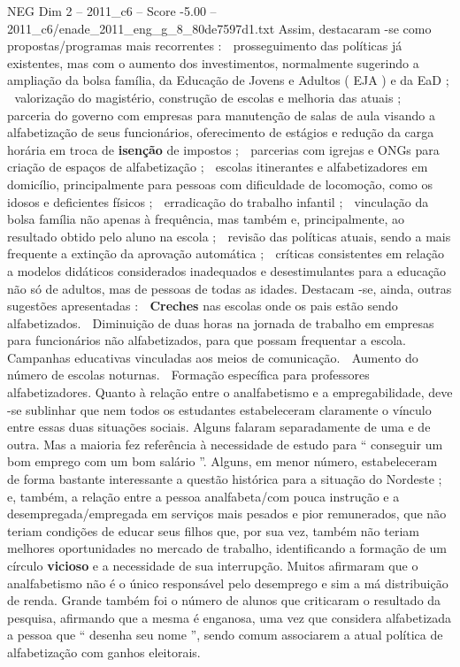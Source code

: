 \begin{textsample}{NEG Dim 2 – 2011\_c6 – Score -5.00 – 2011\_c6/enade\_2011\_eng\_g\_8\_80de7597d1.txt}
Assim, destacaram -se como propostas/programas mais recorrentes :  prosseguimento das políticas já existentes, mas com o aumento dos investimentos, normalmente sugerindo a ampliação da bolsa família, da Educação de Jovens e Adultos ( EJA ) e da EaD ;  valorização do magistério, construção de escolas e melhoria das atuais ;  parceria do governo com empresas para manutenção de salas de aula visando a alfabetização de seus funcionários, oferecimento de estágios e redução da carga horária em troca de \textbf{isenção} de impostos ;  parcerias com igrejas e ONGs para criação de espaços de alfabetização ;  escolas itinerantes e alfabetizadores em domicílio, principalmente para pessoas com dificuldade de locomoção, como os idosos e deficientes físicos ;  erradicação do trabalho infantil ;  vinculação da bolsa família não apenas à frequência, mas também e, principalmente, ao resultado obtido pelo aluno na escola ;  revisão das políticas atuais, sendo a mais frequente a extinção da aprovação automática ;  críticas consistentes em relação a modelos didáticos considerados inadequados e desestimulantes para a educação não só de adultos, mas de pessoas de todas as idades.
Destacam -se, ainda, outras sugestões apresentadas :  \textbf{Creches} nas escolas onde os pais estão sendo alfabetizados.  Diminuição de duas horas na jornada de trabalho em empresas para funcionários não alfabetizados, para que possam frequentar a escola.  Campanhas educativas vinculadas aos meios de comunicação.  Aumento do número de escolas noturnas.  Formação específica para professores alfabetizadores.
Quanto à relação entre o analfabetismo e a empregabilidade, deve -se sublinhar que nem todos os estudantes estabeleceram claramente o vínculo entre essas duas situações sociais.
Alguns falaram separadamente de uma e de outra.
Mas a maioria fez referência à necessidade de estudo para “ conseguir um bom emprego com um bom salário ”.
Alguns, em menor número, estabeleceram de forma bastante interessante a questão histórica para a situação do Nordeste ; e, também, a relação entre a pessoa analfabeta/com pouca instrução e a desempregada/empregada em serviços mais pesados e pior remunerados, que não teriam condições de educar seus filhos que, por sua vez, também não teriam melhores oportunidades no mercado de trabalho, identificando a formação de um círculo \textbf{vicioso} e a necessidade de sua interrupção.
Muitos afirmaram que o analfabetismo não é o único responsável pelo desemprego e sim a má distribuição de renda.
Grande também foi o número de alunos que criticaram o resultado da pesquisa, afirmando que a mesma é enganosa, uma vez que considera alfabetizada a pessoa que “ desenha seu nome ”, sendo comum associarem a atual política de alfabetização com ganhos eleitorais.

\end{textsample}
